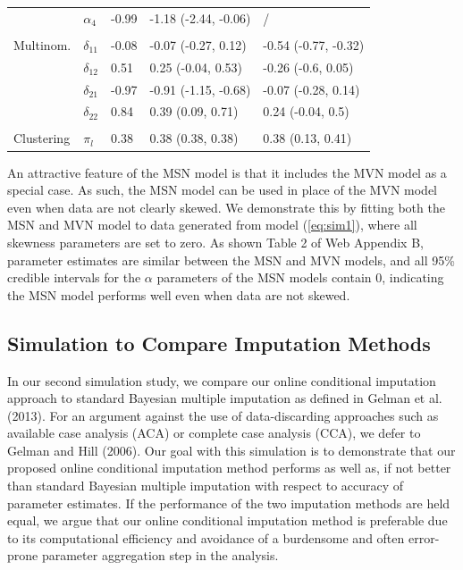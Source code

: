 \documentclass[useAMS,referee]{biom}
\begin{document}
\begin{table}[t]
\begin{tabular}{lllll}
\hspace{1em} & $\alpha_{4}$ & -0.99 & -1.18 (-2.44, -0.06) &     / \\
\addlinespace[0.3em]
\multicolumn{5}{l}{\textbf{ }}\\
\hspace{1em}Multinom. & $\delta_{11}$ & -0.08 & -0.07 (-0.27, 0.12) & -0.54 (-0.77, -0.32)\\
\hspace{1em} & $\delta_{12}$ & 0.51 & 0.25 (-0.04, 0.53) & -0.26 (-0.6, 0.05)\\
\hspace{1em} & $\delta_{21}$ & -0.97 & -0.91 (-1.15, -0.68) & -0.07 (-0.28, 0.14)\\
\hspace{1em} & $\delta_{22}$ & 0.84 & 0.39 (0.09, 0.71) & 0.24 (-0.04, 0.5)\\
\addlinespace[0.3em]
\multicolumn{5}{l}{\textbf{ }}\\
\hspace{1em}Clustering & $\pi_l$ & 0.38 & 0.38 (0.38, 0.38) & 0.38 (0.13, 0.41)\\
\bottomrule
\end{tabular}
\end{table}

An attractive feature of the MSN model is that it includes the MVN model as a special case. As such, the MSN model can be used in place of the MVN model even when data are not clearly skewed. We demonstrate this by fitting both the MSN and MVN model to data generated from model (\ref{eq:sim1}), where all skewness parameters are set to zero. As shown Table 2 of Web Appendix B, parameter estimates are similar between the MSN and MVN models, and all 95\% credible intervals for the $\alpha$ parameters of the MSN models contain 0, indicating the MSN model performs well even when data are not skewed.

\subsection{Simulation to Compare Imputation Methods}

In our second simulation study, we compare our online conditional imputation approach to standard Bayesian multiple imputation as defined in Gelman et al. (2013). For an argument against the use of data-discarding approaches such as available case analysis (ACA) or complete case analysis (CCA), we defer to Gelman and Hill (2006). Our goal with this simulation is to demonstrate that our proposed online conditional imputation method performs as well as, if not better than standard Bayesian multiple imputation with respect to accuracy of parameter estimates. If the performance of the two imputation methods are held equal, we argue that our online conditional imputation method is preferable due to its computational efficiency and avoidance of a burdensome and often error-prone parameter aggregation step in the analysis.
\end{document}
